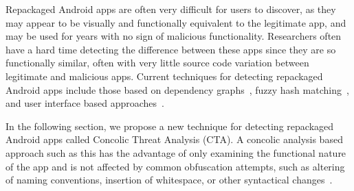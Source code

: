 \documentclass{sig-alternate}
\begin{document}
Repackaged Android apps are often very difficult for users to discover, as they may appear to be visually and functionally equivalent to the legitimate app, and may be used for years with no sign of malicious functionality. Researchers often have a hard time detecting the difference between these apps since they are so functionally similar, often with very little source code variation between legitimate and malicious apps. Current techniques for detecting repackaged Android apps include those based on dependency graphs~\cite{Chen:2014:AAS:2568225.2568286}, fuzzy hash matching~\cite{Zhou:2012:DRS:2133601.2133640}, and user interface based approaches~\cite{Zhang:2014:VTO:2627393.2627395}.



In the following section, we propose a new technique for detecting repackaged Android apps called Concolic Threat Analysis (CTA). A concolic analysis based approach such as this has the advantage of only examining the functional nature of the app and is not affected by common obfuscation attempts, such as altering of naming conventions, insertion of whitespace, or other syntactical changes~\cite{krutz2013cccd}.






\end{document}

